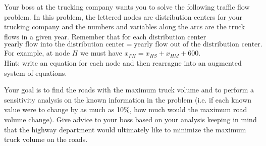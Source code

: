 % 
\begin{lab}
Your boss at the trucking company wants you to solve the following traffic flow problem.
In this problem, the lettered nodes are distribution centers for your trucking company and
the numbers and variables along the arcs are the truck flows in a given year.  Remember
that for each distribution center
\[ \text{yearly flow into the distribution center} = \text{yearly flow out of the
distribution center}. \]
For example, at node $H$ we must have $x_{FH} = x_{HS}+x_{HM}+600$. \\Hint: write an
equation for each node and then rearragne into an augmented system of equations.

Your goal is to find the roads with the maximum truck volume and to perform a sensitivity
analysis on the known information in the problem (i.e. if each known value were to change
by as much as 10\%, how much would the maximum road volume change).  Give advice to your
boss based on your analysis keeping in mind that the highway department would ultimately
like to minimize the maximum truck volume on the roads.
\begin{center}
\end{center}
\end{lab}


